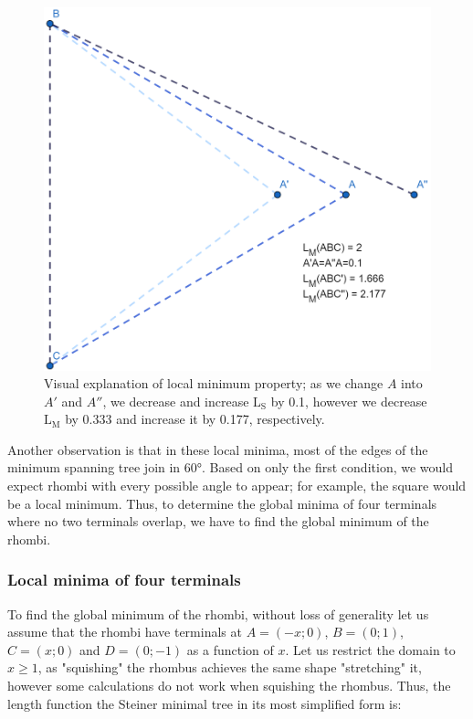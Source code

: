 \documentclass{mpaper}
\begin{document}
\begin{figure}[h!]
  \begin{center}
  \includegraphics[scale=1.3]{plot9.png}
  \end{center}
  \caption{\label{fig:10}Visual explanation of local minimum property; as we change $A$ into $A'$ and $A''$, we decrease and increase $\operatorname{L_S}$ by 0.1, however we decrease $\operatorname{L_M}$ by 0.333 and increase it by 0.177, respectively.}
\end{figure}

Another observation is that in these local minima, most of the edges of the minimum spanning tree join in 60°. Based on only the first condition, we would expect rhombi with every possible angle to appear; for example, the square would be a local minimum. Thus, to determine the global minima of four terminals where no two terminals overlap, we have to find the global minimum of the rhombi.


\subsubsection{Local minima of four terminals}


To find the global minimum of the rhombi, without loss of generality let us assume that the rhombi have terminals at $A=(-x;0)$, $B=(0;1)$, $C=(x;0)$ and $D=(0;-1)$ as a function of $x$. Let us restrict the domain to $x\geq1$, as "squishing" the rhombus achieves the same shape "stretching" it, however some calculations do not work when squishing the rhombus. Thus, the length function the Steiner minimal tree in its most simplified form is:
\end{document}
